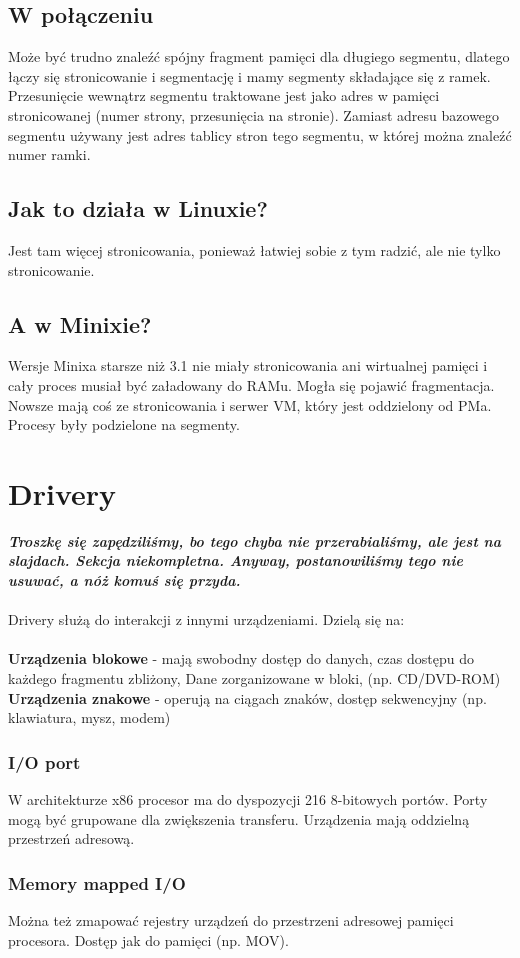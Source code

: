 \documentclass[12pt, a4paper, polish, openany]{book}
\begin{document}
\subsection{W połączeniu}
Może być trudno znaleźć spójny fragment pamięci dla długiego segmentu, dlatego łączy się stronicowanie i segmentację i mamy segmenty składające się z ramek. Przesunięcie wewnątrz segmentu traktowane jest jako adres w pamięci stronicowanej (numer strony, przesunięcia na stronie). Zamiast adresu bazowego segmentu używany jest adres tablicy stron tego segmentu, w której można znaleźć numer ramki.
\subsection{Jak to działa w Linuxie?}
Jest tam więcej stronicowania, ponieważ łatwiej sobie z tym radzić, ale nie tylko stronicowanie.
\subsection{A w Minixie?}
Wersje Minixa starsze niż 3.1 nie miały stronicowania ani wirtualnej pamięci i cały proces musiał być załadowany do RAMu. Mogła się pojawić fragmentacja. Nowsze mają coś ze stronicowania i serwer VM, który jest oddzielony od PMa. Procesy były podzielone na segmenty.
\section{Drivery}
\textbf{\textit{Troszkę się zapędziliśmy, bo tego chyba nie przerabialiśmy, ale jest na slajdach. Sekcja niekompletna. Anyway, postanowiliśmy tego nie usuwać, a nóż komuś się przyda.}}\\\\
Drivery służą do interakcji z innymi urządzeniami.
Dzielą się na:\\\\
\textbf{Urządzenia blokowe} - mają swobodny dostęp do danych, czas dostępu do każdego fragmentu zbliżony, Dane zorganizowane w bloki, (np. CD/DVD-ROM)\\
\textbf{Urządzenia znakowe} - operują na ciągach znaków, dostęp sekwencyjny (np. klawiatura, mysz, modem)
\subsubsection{I/O port}
W architekturze x86 procesor ma do dyspozycji 216 8-bitowych portów. Porty mogą być grupowane dla zwiększenia transferu. Urządzenia mają oddzielną przestrzeń adresową.
\subsubsection{Memory mapped I/O}
Można też zmapować rejestry urządzeń do przestrzeni adresowej pamięci procesora. Dostęp jak do pamięci (np. MOV).
\end{document}
